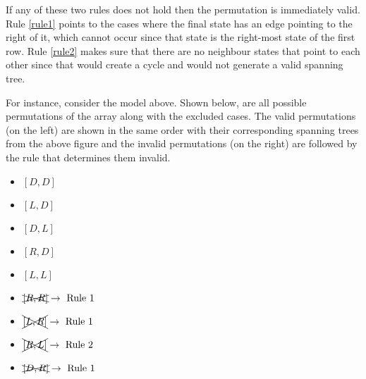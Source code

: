 If any of these two rules does not hold then the permutation is immediately valid. Rule \ref{rule1} points to the cases where the final state has an edge pointing to the right of it, which cannot occur since that state is the right-most state of the first row. Rule \ref{rule2} makes sure that there are no neighbour states that point to each other since that would create a cycle and would not generate a valid spanning tree.

For instance, consider the model above. Shown below, are all possible permutations of the array along with the excluded cases. The valid permutations (on the left) are shown in the same order with their corresponding spanning trees from the above figure and the invalid permutations (on the right) are followed by the rule that determines them invalid.

\begin{multicols}{2}
    \begin{itemize}
        \item \([D, D]\)
        \item \([L, D]\)
        \item \([D, L]\)
        \item \([R, D]\)
        \item \([L, L]\)
        \item \(\xcancel{[R, R]} \rightarrow \text{ Rule 1}\) 
        \item \(\xcancel{[L, R]} \rightarrow \text{ Rule 1}\)
        \item \(\xcancel{[R, L]} \rightarrow \text{ Rule 2}\)
        \item \(\xcancel{[D, R]} \rightarrow \text{ Rule 1}\)
    \end{itemize}
\end{multicols}
